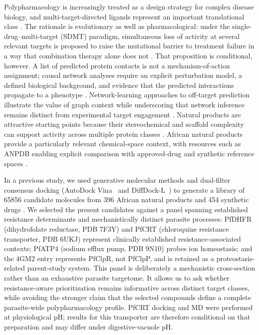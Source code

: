 \documentclass[journal=jcisd8,manuscript=article,layout=traditional]{achemso}
\begin{document}
Polypharmacology is increasingly treated as a design strategy for complex disease biology, and multi-target-directed ligands represent an important translational class \citep{Ryszkiewicz2026MTDL}. The rationale is evolutionary as well as pharmacological: under the single-drug--multi-target (SDMT) paradigm, simultaneous loss of activity at several relevant targets is proposed to raise the mutational barrier to treatment failure in a way that combination therapy alone does not \citep{sdmt2026trends}. That proposition is conditional, however. A list of predicted protein contacts is not a mechanism-of-action assignment; causal network analyses require an explicit perturbation model, a defined biological background, and evidence that the predicted interactions propagate to a phenotype \citep{Trapotsi2022MoA}. Network-learning approaches to off-target prediction illustrate the value of graph context while underscoring that network inference remains distinct from experimental target engagement \citep{Sentinel2025Offtarget}. Natural products are attractive starting points because their stereochemical and scaffold complexity can support activity across multiple protein classes \citep{polypharmacology_malaria_2026,value_addition_african_np_2025}. African natural products provide a particularly relevant chemical-space context, with resources such as ANPDB enabling explicit comparison with approved-drug and synthetic reference spaces \citep{anpdb_2026}.

In a previous study, we used generative molecular methods and dual-filter consensus docking (AutoDock Vina~\citep{vina_2021} and DiffDock-L~\citep{diffdock_2023}) to generate a library of \num{65856} candidate molecules from 396 African natural products and 454 synthetic drugs \citep{temgoua2026antimalarial}. We selected the present candidates against a panel spanning established resistance determinants and mechanistically distinct parasite processes: PfDHFR (dihydrofolate reductase, PDB 7F3Y) and PfCRT (chloroquine resistance transporter, PDB 6UKJ) represent clinically established resistance-associated contexts; PfATP4 (sodium efflux pump, PDB 9N10) probes ion homeostasis; and the 4GM2 entry represents PfClpR, not PfClpP, and is retained as a proteostasis-related parent-study system. This panel is deliberately a mechanistic cross-section rather than an exhaustive parasite targetome. It allows us to ask whether resistance-aware prioritization remains informative across distinct target classes, while avoiding the stronger claim that the selected compounds define a complete parasite-wide polypharmacology profile. PfCRT docking and MD were performed at physiological pH; results for this transporter are therefore conditional on that preparation and may differ under digestive-vacuole pH.
\end{document}
